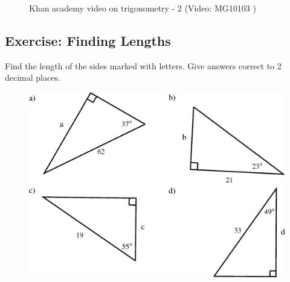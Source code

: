     \setcounter{subfigure}{0}
	\begin{figure}[H] %
    \textnormal{Khan academy video on trigonometry - 2}\vspace{.1in} \nopagebreak
  \label{m39408*yt-media2}\label{m39408*yt-video2}
             { (Video:  MG10103 )}
      \vspace{2pt}
    \vspace{.1in}
 \end{figure}       \par \label{m39408*secfhsst!!!underscore!!!id1260}
            \subsection{Exercise: Finding Lengths }
            \nopagebreak
            \label{m39408*id81582}Find the length of the sides marked with letters. Give answers correct to 2 decimal places.
    \setcounter{subfigure}{0}
	\begin{figure}[H] %
    \begin{center}
    \label{m39408*id81592!!!underscore!!!media}\label{m39408*id81592!!!underscore!!!printimage}\includegraphics{col11306.imgs/m39408_MG10C15_010.png} %
      \vspace{2pt}
    \vspace{.1in}
    \end{center}
 \end{figure}       
